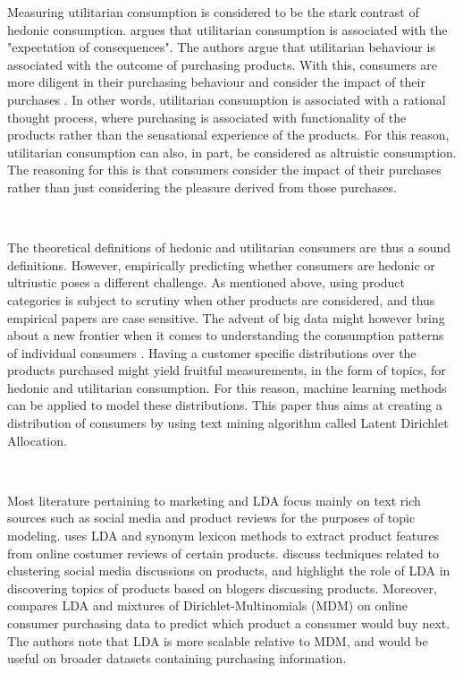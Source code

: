 Measuring utilitarian consumption is considered to be the stark contrast of hedonic consumption. \cite{batra1991measuring} argues that utilitarian consumption is associated with the "expectation of consequences". The authors argue that utilitarian behaviour is associated with the outcome of purchasing products. With this, consumers are more diligent in their purchasing behaviour and consider the impact of their purchases \citep{batra1991measuring}. In other words, utilitarian consumption is associated with a rational thought process, where purchasing is associated with functionality of the products rather than the sensational experience of the products. For this reason, utilitarian consumption can also, in part, be considered as altruistic consumption. The reasoning for this is that consumers consider the impact of their purchases rather than just considering the pleasure derived from those purchases. 


\

The theoretical definitions of hedonic and utilitarian consumers are thus a sound definitions. However, empirically predicting whether consumers are hedonic or ultriustic poses a different challenge. As mentioned above, using product categories is subject to scrutiny when other products are considered, and thus empirical papers are case sensitive. The advent of big data might however bring about a new frontier when it comes to understanding the consumption patterns of individual consumers \cite{badea2014predicting}. Having a customer specific distributions over the products purchased might yield fruitful measurements, in the form of topics, for hedonic and utilitarian consumption. For this reason, machine learning methods can be applied to model these distributions. This paper thus aims at creating a distribution of consumers by using text mining algorithm called Latent Dirichlet Allocation. 

\

Most literature pertaining to marketing and LDA focus mainly on text rich sources such as social media and product reviews for the purposes of topic modeling. \cite{ma2013lda} uses LDA and synonym lexicon methods to extract product features from online costumer reviews of certain products. \cite{melville2009social} discuss techniques related to clustering social media discussions on products, and highlight the role of LDA in discovering topics of products based on blogers discussing products. Moreover, \cite{jacobs2016model} compares LDA and mixtures of Dirichlet-Multinomials (MDM) on online consumer purchasing data to predict which product a consumer would buy next. The authors note that LDA is more scalable relative to MDM, and would be useful on broader datasets containing purchasing information. 

